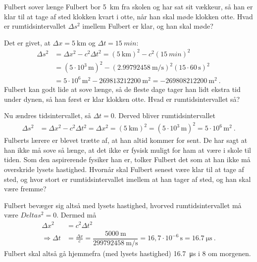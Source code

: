 \begin{opgave}{Fulbert sover længe}%
    Fulbert bor \SI{5}{km} fra skolen og har sat sit vækkeur, så han er klar til at tage af sted klokken kvart i otte, når han skal møde klokken otte.
    \opg Hvad er rumtidsintervallet $\Delta s^2$ imellem Fulbert er klar, og han skal møde?
    
    Det er givet, at $\Delta x = \SI{5}{\kilo\metre}$ og $\Delta t = \SI{15}{min}$:
    \begin{align}
        \Delta s^2 &= \Delta x^2 - c^2 \Delta t^2
            = (\SI{5}{\kilo\metre})^2 - c^2 (\SI{15}{min})^2 \nonumber\\
            &= \left(5 \cdot 10^3 \, \si{\metre}\right)^2 - \left(\SI{2,99792458}{\metre\per\second}\right)^2 \left(15 \cdot 60 \, \si{\second}\right)^2 \nonumber\\
            &= 5 \cdot 10^6 \, \si{\metre\squared} - \SI{269813212200}{\metre\squared}
            = \SI{-269808212200}{\metre\squared} \: .
    \end{align}
    \newline
    Fulbert kan godt lide at sove længe, så de fleste dage tager han lidt ekstra tid under dynen, så han først er klar klokken otte.
    \opg Hvad er rumtidsintervallet så?
    
    Nu ændres tidsintervallet, så $\Delta t = 0$. Derved bliver rumtidsintervallet
    \begin{align}
        \Delta s^2 &= \Delta x^2 - c^2 \Delta t^2
            = \Delta x^2
            = (\SI{5}{\kilo\metre})^2
            = \left(5 \cdot 10^3 \, \si{\metre}\right)^2
            = 5 \cdot 10^6 \, \si{\metre\squared} \: .
    \end{align}
    \newline
    Fulberts lærere er blevet trætte af, at han altid kommer for sent.
    De har sagt at han ikke må sove så længe, at det ikke er fysisk muligt for ham at være i skole til tiden.
    Som den aspirerende fysiker han er, tolker Fulbert det som at han ikke må overskride lysets hastighed.
    \opg Hvornår skal Fulbert senest være klar til at tage af sted, og hvor stort er rumtidsintervallet imellem at han tager af sted, og han skal være fremme?
    
    Fulbert bevæger sig altså med lysets hastighed, hvorved rumtidsintervallet må være $Delta s^2 = 0$. Dermed må
    \begin{align}
        \Delta x^2 &= c^2 \Delta t^2 \\
        \Rightarrow \Delta t &= \frac{\Delta x}{c} = \dfrac{\SI{5000}{\metre}}{\SI{299792458}{\metre\per\second}}
            = 16,7 \cdot 10^{-6} \, \si{\second}
            = \SI{16,7}{\micro\second} \: .
    \end{align}
    Fulbert skal altså gå hjemmefra (med lysets hastighed) \SI{16,7}{\micro\second} i 8 om morgenen.
\end{opgave}
    
